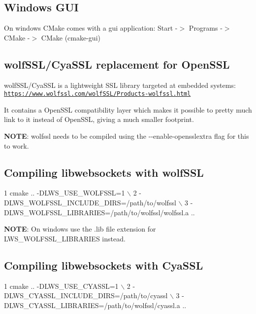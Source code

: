 \subsection*{Windows G\+UI }

On windows C\+Make comes with a gui application\+: Start -\/$>$ Programs -\/$>$ C\+Make -\/$>$ C\+Make (cmake-\/gui)

\subsection*{wolf\+S\+S\+L/\+Cya\+S\+SL replacement for Open\+S\+SL }

wolf\+S\+S\+L/\+Cya\+S\+SL is a lightweight S\+SL library targeted at embedded systems\+: \href{https://www.wolfssl.com/wolfSSL/Products-wolfssl.html}{\tt https\+://www.\+wolfssl.\+com/wolf\+S\+S\+L/\+Products-\/wolfssl.\+html}

It contains a Open\+S\+SL compatibility layer which makes it possible to pretty much link to it instead of Open\+S\+SL, giving a much smaller footprint.

{\bfseries N\+O\+TE}\+: wolfssl needs to be compiled using the {\ttfamily -\/-\/enable-\/opensslextra} flag for this to work.

\subsection*{Compiling libwebsockets with wolf\+S\+SL }


\begin{DoxyCode}
1 cmake .. -DLWS\_USE\_WOLFSSL=1 \(\backslash\)
2          -DLWS\_WOLFSSL\_INCLUDE\_DIRS=/path/to/wolfssl \(\backslash\)
3          -DLWS\_WOLFSSL\_LIBRARIES=/path/to/wolfssl/wolfssl.a ..
\end{DoxyCode}


{\bfseries N\+O\+TE}\+: On windows use the .lib file extension for {\ttfamily L\+W\+S\+\_\+\+W\+O\+L\+F\+S\+S\+L\+\_\+\+L\+I\+B\+R\+A\+R\+I\+ES} instead.

\subsection*{Compiling libwebsockets with Cya\+S\+SL }


\begin{DoxyCode}
1 cmake .. -DLWS\_USE\_CYASSL=1 \(\backslash\)
2          -DLWS\_CYASSL\_INCLUDE\_DIRS=/path/to/cyassl \(\backslash\)
3          -DLWS\_CYASSL\_LIBRARIES=/path/to/wolfssl/cyassl.a ..
\end{DoxyCode}


